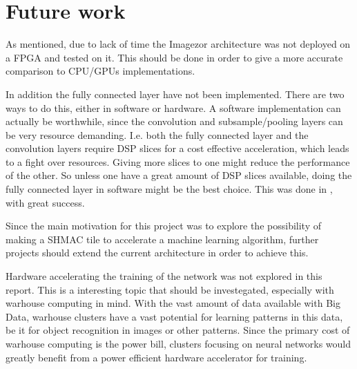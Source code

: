 \chapter{Future work}

As mentioned, due to lack of time the Imagezor architecture was not deployed on a FPGA and tested on it. This should be done in order to give a more accurate comparison to CPU/GPUs implementations.

In addition the fully connected layer have not been implemented. There are two ways to do this, either in software or hardware. A software implementation can actually be worthwhile, since the convolution and subsample/pooling layers can be very resource demanding.  I.e. both the fully connected layer and the convolution layers require DSP slices for a cost effective acceleration, which leads to a fight over resources. Giving more slices to one might reduce the performance of the other. So unless one have a great amount of DSP slices available, doing the fully connected layer in software might be the best choice. This was done in \cite{Paper}, with great success.

Since the main motivation for this project was to explore the possibility of making a SHMAC tile to accelerate a machine learning algorithm, further projects should extend the current architecture in order to achieve this.

Hardware accelerating the training of the network was not explored in this report. This is a interesting topic that should be investegated, especially with warhouse computing in mind. With the vast amount of data available with Big Data, warhouse clusters have a vast potential for learning patterns in this data, be it for object recognition in images or other patterns. Since the primary cost of warhouse computing is the power bill, clusters focusing on neural networks would greatly benefit from a power efficient hardware accelerator for training. 